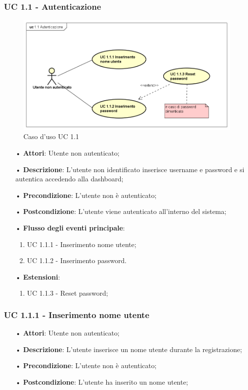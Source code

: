 \subsubsection{UC 1.1 - Autenticazione}
\begin{figure}[H]
\centering
\includegraphics[width=17cm]{img/UC11.png} 
\caption{Caso d'uso UC 1.1}\label{fig:11}
\end{figure}
\begin{itemize}
\item[•]\textbf{Attori}: Utente non autenticato;
\item[•]\textbf{Descrizione}:  L’utente non identificato inserisce username e password e si autentica accedendo alla dashboard;
\item[•]\textbf{Precondizione}: L’utente non è autenticato;
\item[•]\textbf{Postcondizione}: L’utente viene autenticato all’interno del sistema;
\item[•]\textbf{Flusso degli eventi principale}:
\begin{enumerate}
\item UC 1.1.1 - Inserimento nome utente;
\item UC 1.1.2 - Inserimento password.
\end{enumerate}
\item[•]\textbf{Estensioni}:
\begin{enumerate}
\item UC 1.1.3 - Reset password;

\end{enumerate}
\end{itemize}

\subsubsection{UC 1.1.1 - Inserimento nome utente}
\begin{itemize}
\item[•]\textbf{Attori}: Utente non autenticato;
\item[•]\textbf{Descrizione}: L’utente inserisce un nome utente durante la registrazione;
\item[•]\textbf{Precondizione}: L’utente non è autenticato;
\item[•]\textbf{Postcondizione}: L’utente ha inserito un nome utente;
\end{itemize}

